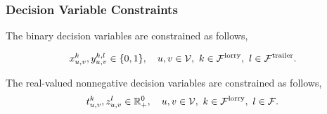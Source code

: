 %
%
%
%
%
%
%
%


\subsubsection{Decision Variable Constraints}

The binary decision variables are constrained as follows,

\begin{align}
x^k_{u,v}, y^{k,l}_{u,v} \in \{ 0,1 \} ,
\quad u,v \in \mathcal V,
\ k \in \mathcal{F}^{\rm lorry},
\ l \in \mathcal{F}^{\rm trailer}.
\end{align}

The real-valued nonnegative decision variables are constrained as follows,
\begin{align}
\label{con:last}
t^k_{u,v}, z^{l}_{u,v} \in \mathbb{R}^0_+,
\quad u,v \in \mathcal V,
\ k \in \mathcal{F}^{\rm lorry},
\ l \in \mathcal{F}.
\end{align}

